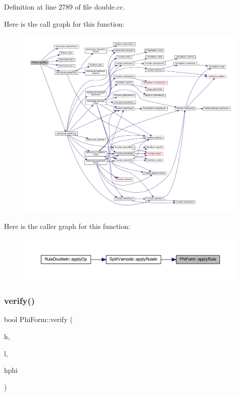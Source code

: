 Definition at line 2789 of file double.\+cc.

Here is the call graph for this function\+:
\nopagebreak
\begin{figure}[H]
\begin{center}
\leavevmode
\includegraphics[width=350pt]{class_phi_form_afc1412bb35a1236fd0318fb42b813113_cgraph}
\end{center}
\end{figure}
Here is the caller graph for this function\+:
\nopagebreak
\begin{figure}[H]
\begin{center}
\leavevmode
\includegraphics[width=350pt]{class_phi_form_afc1412bb35a1236fd0318fb42b813113_icgraph}
\end{center}
\end{figure}
\mbox{\label{class_phi_form_ae7266e0446e1377f7547a6c81453fb4f}} 
\subsubsection{\texorpdfstring{verify()}{verify()}}
{\footnotesize\ttfamily bool Phi\+Form\+::verify (\begin{DoxyParamCaption}\item[{\mbox{\hyperlink{class_varnode}{Varnode}} $\ast$}]{h,  }\item[{\mbox{\hyperlink{class_varnode}{Varnode}} $\ast$}]{l,  }\item[{\mbox{\hyperlink{class_pcode_op}{Pcode\+Op}} $\ast$}]{hphi }\end{DoxyParamCaption})}




